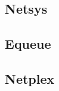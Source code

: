 \inputminted[fontsize=\scriptsize]{ocaml}{code/net/test_netmime.ml}

\subsection{Netsys}

\subsection{Equeue}
\label{sec:Equeue}

\subsection{Netplex}
\label{sec:Netplex}
























